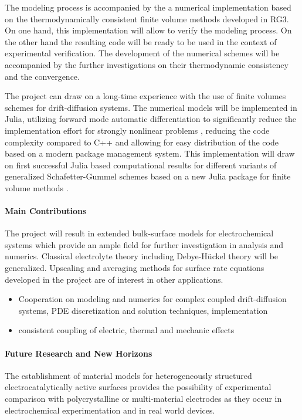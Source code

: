 \documentclass[a4paper,10pt]{article}
\begin{document}
The modeling process is accompanied by the a numerical implementation based on the
thermodynamically consistent finite volume methods developed in RG3.
On one hand, this implementation will allow to verify the modeling process. On the other
hand the resulting code will be ready to be used in the context of experimental verification.
The development of the numerical schemes will be accompanied by the further investigations
on their thermodynamic consistency and the convergence.

The project can draw on a long-time experience with the use of finite volumes schemes for drift-diffusion systems.
The numerical models will be implemented in  Julia, utilizing forward mode automatic
differentiation to significantly reduce the implementation
effort for strongly nonlinear problems \cite{VoronoiFVM}, reducing the code complexity compared
to C++ and allowing for easy distribution of the code based on a modern package management system.
This implementation will draw on first successful Julia based computational results
for  different variants of generalized Schafetter-Gummel
schemes \cite{CCFG2020,VagnerEtAl2019} based on a new Julia package for finite volume methods \cite{VoronoiFVM}.


\paragraph{Main Contributions}
The project will result in extended bulk-surface models for electrochemical systems which provide
an ample field for further investigation in analysis and numerics. 
Classical electrolyte theory including Debye-H\"uckel theory will be generalized.
Upscaling and averaging methods
for surface rate equations developed in the project are of interest in other applications.

\begin{itemize}
\item Cooperation on modeling and numerics for complex coupled drift-diffusion systems, PDE
  discretization and solution techniques, implementation
\item consistent coupling of electric, thermal and mechanic effects
\end{itemize}


\paragraph{Future Research and New Horizons}
The establishment of material models for heterogeneously structured electrocatalytically active surfaces
provides the possibility of experimental comparison with polycrystalline or  multi-material electrodes
as they occur in electrochemical experimentation and in real world devices.
\end{document}
